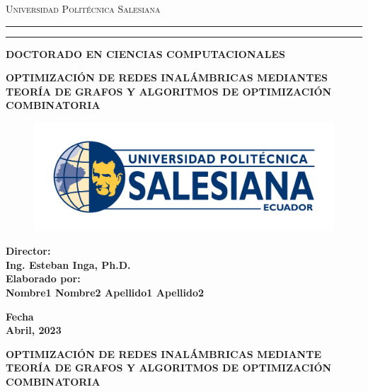      \thispagestyle{empty}%
 \begin{titlepage}
    \begin{center}

{{\Large{\textsc{Universidad Politécnica Salesiana}}}} \rule[0.1cm]{16cm}{0.1mm}
\rule[0.5cm]{16cm}{0.6mm}
{\Large{\bf DOCTORADO EN CIENCIAS COMPUTACIONALES }}
\end{center}
\vspace{15mm}
\begin{center}
{\LARGE{\bf OPTIMIZACIÓN DE REDES INALÁMBRICAS MEDIANTES TEORÍA DE GRAFOS  Y ALGORITMOS DE OPTIMIZACIÓN COMBINATORIA }}\\
\vspace{6mm}
\end{center}
\vspace{22mm}
\par
\noindent

\begin{figure}
\begin{center}
\includegraphics[scale=0.3]{logoups.png}
\vspace{-0.2cm} 
\end{center}
\end{figure}


\begin{minipage}[t]{0.57\textwidth}
{\large{\bf Director:\\
Ing. Esteban Inga, Ph.D. \\{\vskip 5mm} Elaborado por:\\
Nombre1 Nombre2 Apellido1 Apellido2 }}
\end{minipage}
\hfill
\vspace{10mm}
\begin{center}
{\large{\bf Fecha\\%
Abril, 2023 }}%
\end{center}
\end{titlepage}
\newpage
 \thispagestyle{empty}%
     \begin{center}
        \large\uppercase\expandafter{\textbf{Optimización de redes inalámbricas mediante teoría de grafos y algoritmos de optimización combinatoria}}
     \end{center}

